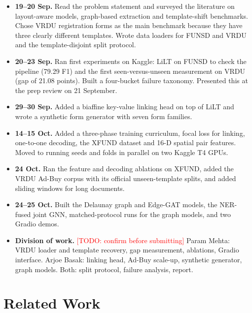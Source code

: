 \documentclass[11pt,a4paper]{article}
\newcommand{\todo}[1]{\textcolor{red}{[TODO: #1]}}
\begin{document}
\begin{itemize}
  \item \textbf{19--20 Sep.} Read the problem statement and surveyed the literature on layout-aware models, graph-based extraction and template-shift benchmarks. Chose VRDU registration forms as the main benchmark because they have three clearly different templates. Wrote data loaders for FUNSD and VRDU and the template-disjoint split protocol.
  \item \textbf{20--23 Sep.} Ran first experiments on Kaggle: LiLT on FUNSD to check the pipeline (79.29 F1) and the first seen-versus-unseen measurement on VRDU (gap of 21.08 points). Built a four-bucket failure taxonomy. Presented this at the prep review on 21 September.
  \item \textbf{29--30 Sep.} Added a biaffine key-value linking head on top of LiLT and wrote a synthetic form generator with seven form families.
  \item \textbf{14--15 Oct.} Added a three-phase training curriculum, focal loss for linking, one-to-one decoding, the XFUND dataset and 16-D spatial pair features. Moved to running seeds and folds in parallel on two Kaggle T4 GPUs.
  \item \textbf{24 Oct.} Ran the feature and decoding ablations on XFUND, added the VRDU Ad-Buy corpus with its official unseen-template splits, and added sliding windows for long documents.
  \item \textbf{24--25 Oct.} Built the Delaunay graph and Edge-GAT models, the NER-fused joint GNN, matched-protocol runs for the graph models, and two Gradio demos.
  \item \textbf{Division of work.} \todo{confirm before submitting} Param Mehta: VRDU loader and template recovery, gap measurement, ablations, Gradio interface. Arjoe Basak: linking head, Ad-Buy scale-up, synthetic generator, graph models. Both: split protocol, failure analysis, report.
\end{itemize}

\section{Related Work}
\end{document}
